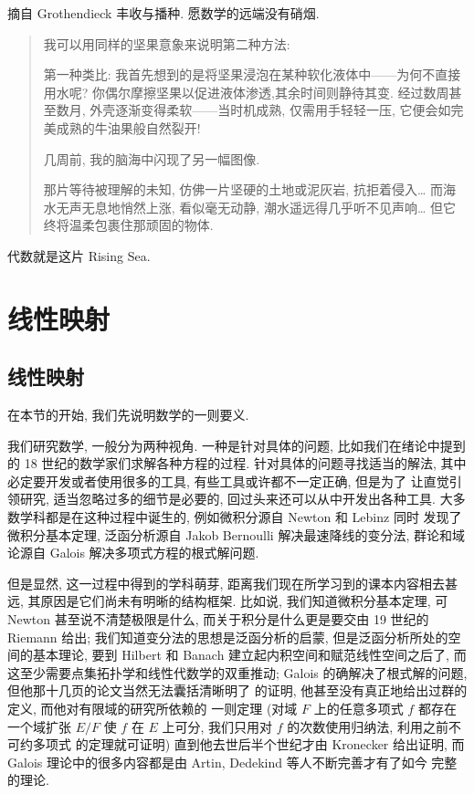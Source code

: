 \documentclass[UTF8]{book}
\begin{document}
\vspace*{5em}

摘自 Grothendieck 丰收与播种. 愿数学的远端没有硝烟. 

\begin{quotation}
    
    \kaishu   
    我可以用同样的坚果意象来说明第二种方法: 
    
    第一种类比: 
    我首先想到的是将坚果浸泡在某种软化液体中——为何不直接用水呢? 
    你偶尔摩擦坚果以促进液体渗透,其余时间则静待其变. 
    经过数周甚至数月, 外壳逐渐变得柔软——当时机成熟, 仅需用手轻轻一压, 
    它便会如完美成熟的牛油果般自然裂开! 

    几周前, 我的脑海中闪现了另一幅图像. 
      
    那片等待被理解的未知, 仿佛一片坚硬的土地或泥灰岩, 抗拒着侵入\dots
    而海水无声无息地悄然上涨, 看似毫无动静, 潮水遥远得几乎听不见声响\dots 
    但它终将温柔包裹住那顽固的物体. 
    
\end{quotation}

代数就是这片 Rising Sea. 

\setcounter{chapter}{7}
\chapter{线性映射}
\section{线性映射}

在本节的开始, 我们先说明数学的一则要义. 

我们研究数学, 一般分为两种视角. 
一种是针对具体的问题, 比如我们在绪论中提到的 
18 世纪的数学家们求解各种方程的过程. 针对具体的问题寻找适当的解法, 
其中必定要开发或者使用很多的工具, 有些工具或许都不一定正确, 但是为了
让直觉引领研究, 适当忽略过多的细节是必要的, 回过头来还可以从中开发出各种工具. 
大多数学科都是在这种过程中诞生的, 例如微积分源自 Newton 和 Lebinz 同时
发现了微积分基本定理, 泛函分析源自 Jakob Bernoulli 解决最速降线的变分法, 
群论和域论源自 Galois 解决多项式方程的根式解问题. 

但是显然, 这一过程中得到的学科萌芽, 距离我们现在所学习到的课本内容相去甚远, 
其原因是它们尚未有明晰的结构框架. 
比如说, 我们知道微积分基本定理, 可 Newton 甚至说不清楚极限是什么, 
而关于积分是什么更是要交由 19 世纪的 Riemann 给出; 
我们知道变分法的思想是泛函分析的启蒙, 但是泛函分析所处的空间的基本理论, 
要到 Hilbert 和 Banach 建立起内积空间和赋范线性空间之后了, 
而这至少需要点集拓扑学和线性代数学的双重推动; 
Galois 的确解决了根式解的问题, 但他那十几页的论文当然无法囊括清晰明了
的证明, 他甚至没有真正地给出过群的定义, 而他对有限域的研究所依赖的
一则定理 (对域 $F$ 上的任意多项式 $f$ 都存在一个域扩张 $E/F$ 使
$f$ 在 $E$ 上可分, 我们只用对 $f$ 的次数使用归纳法, 利用之前不可约多项式
的定理就可证明) 直到他去世后半个世纪才由 Kronecker 给出证明, 
而 Galois 理论中的很多内容都是由 Artin, Dedekind 等人不断完善才有了如今
完整的理论. 
\end{document}
